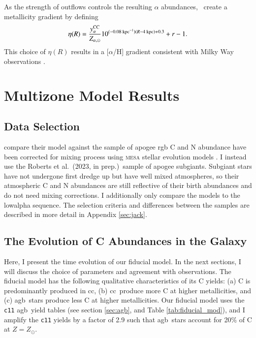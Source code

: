 \documentclass[12pt,oneside,letterpaper]{report}
\newcommand{\cc}{\gls{cc}}
\newcommand{\agb}{\gls{agb}}
\newcommand{\apogee}{\gls{apogee}}
\newcommand{\cxi}{\texttt{\gls{c11}}}
\newcommand{\JJ}{\citetalias{james+21}}
\newcommand{\citetjack}{Roberts et al.~(2023, in prep.)}
\begin{document}
As the strength of outflows controls the resulting $\alpha$ abundances, \JJ~create a metallicity gradient by defining
\begin{equation}
\eta(R) = \frac{y_{\alpha}^{\rm CC}}{Z_{\alpha, \odot}} 10^{(-0.08\text{ kpc}^{-1})(R-4\text{ kpc})+0.3} + r - 1.
\end{equation}
This choice of $\eta(R)$ results in a [$\alpha$/H] gradient consistent with Milky Way observations \citep[e.g.][]{hayden+14, weinberg+19, frinchaboy+13}.


\chapter{Multizone Model Results}
\section{Data Selection}

\citet{james+23} compare their model against the \cite{vincenzo+21} sample of \apogee{} \citep{apogee17} \gls{rgb} C and N abundance have been corrected for mixing process using \textsc{mesa} stellar evolution models \citep{mesa}. 
I instead use the \citetjack~sample of \apogee{} \gls{subgiant}s. Subgiant stars have not undergone first dredge up but have well mixed atmospheres, so their atmospheric C and N abundances are still reflective of their birth abundances and do not need mixing corrections. I additionally only compare the models to the \gls{lowalpha} sequence.  The selection criteria and differences between the samples are described in more detail in Appendix \ref{sec:jack}.



\section{The Evolution of C Abundances in the Galaxy}

Here, I present the time evolution of our fiducial model. In the next sections, I will discuss the choice of parameters and agreement with observations. 
The fiducial model has the following qualitative characteristics of its C yields: (a) C is predominantly produced in \cc, (b) \cc\ produce more C at higher metallicities, and (c) \agb\ stars produce less C at higher metallicities. Our fiducial model uses the \cxi{} \agb\ yield tables (see section \ref{sec:agb}, and Table \ref{tab:fiducial_mod}), and I amplify the \cxi{} yields by a factor of 2.9 such that \agb\ stars account for 20\% of C at $Z=Z_\odot$. 
\end{document}
